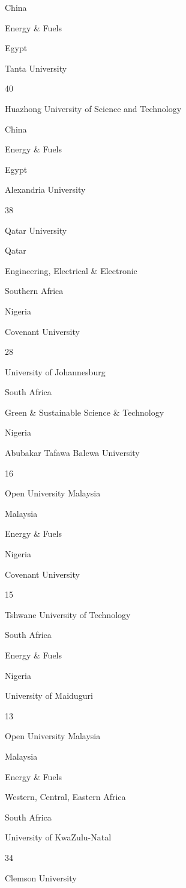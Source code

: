 \documentclass[
]{book}
\begin{document}
{China }

{Energy \& Fuels }

{Egypt }

{Tanta University }

{40}

{Huazhong University of Science and Technology}

{China }

{Energy \& Fuels }

{Egypt }

{Alexandria University }

{38}

{Qatar University }

{Qatar }

{Engineering, Electrical \& Electronic }

Southern Africa

{Nigeria }

{Covenant University }

{28}

{University of Johannesburg }

{South Africa }

{Green \& Sustainable Science \& Technology}

{Nigeria }

{Abubakar Tafawa Balewa University}

{16}

{Open University Malaysia }

{Malaysia }

{Energy \& Fuels }

{Nigeria }

{Covenant University }

{15}

{Tshwane University of Technology }

{South Africa }

{Energy \& Fuels }

{Nigeria }

{University of Maiduguri }

{13}

{Open University Malaysia }

{Malaysia }

{Energy \& Fuels }

Western, Central, Eastern Africa

{South Africa}

{University of KwaZulu-Natal }

{34}

{Clemson University }
\end{document}
